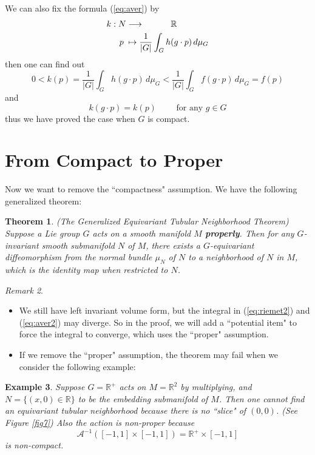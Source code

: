 \documentclass[reqno,11pt]{amsart}
\numberwithin{equation}{section}
\theoremstyle{plain}
\newtheorem{theorem}{Theorem}[section]
\newtheorem{eg}[theorem]{Example}
\theoremstyle{plain}
\numberwithin{equation}{section}
\theoremstyle{remark}
\newtheorem{remark}[theorem]{Remark}
\begin{document}
We can also fix the formula (\ref{eq:aver}) by
\begin{equation}
\begin{aligned}
k:N&\longrightarrow\hspace{1.1cm} \mathbb{R}\\
p\;&\mapsto \frac{1}{|G|}\int_G h(g \cdot p)\,d\mu_G
\label{eq:aver2}
\end{aligned}
\end{equation}
then one can find out
$$0<k(p)=\frac{1}{|G|}\int_G h(g \cdot p)\,d\mu_G<\frac{1}{|G|}\int_G f(g \cdot p)\,d\mu_G=f(p)$$
and $$k(g\cdot p)=k(p)\qquad \text{ for any }g \in G$$
thus we have proved the case when $G$ is compact.

\section{From Compact to Proper} 
Now we want to remove the ``compactness" assumption. We have the following generalized theorem:
\begin{theorem}(The Generalized Equivariant Tubular Neighborhood Theorem)
	\label{thm:equi2}
	Suppose a Lie group $G$
	acts on a smooth manifold $M$ \textbf{properly}. Then for any $G$-invariant smooth submanifold $N$
	of $M$, there exists a $G$-equivariant diffeomorphism from the normal bundle $\mu_N$ of $N$ to a
	neighborhood of $N$ in $M$, which is the identity map when restricted to $N$.
\end{theorem}
\begin{remark}\
\begin{itemize}
	\item We still have left invariant volume form, but the integral in (\ref{eq:riemet2}) and (\ref{eq:aver2}) may diverge. So in the proof, we will add a ``potential item" to force the integral to converge, which uses the ``proper" assumption.
	\item If we remove the ``proper" assumption, the theorem may fail when we consider the following example:
\end{itemize}
\end{remark}
\begin{eg}
	Suppose $G=\mathbb{R}^+$ acts on $M=\mathbb{R}^2$ by multiplying, and $N=\{(x,0) \in \mathbb{R}\}$ to be the embedding submanifold of $M$. Then one cannot find an equivariant tubular neighborhood because there is no ``slice" of $(0,0)$. (See Figure \ref{fig7}) Also the action is non-proper because
	$$\mathcal{A}^{-1}([-1,1] \times [-1,1])=\mathbb{R}^+ \times [-1,1]$$
	is  non-compact.
\end{eg}
\end{document}
